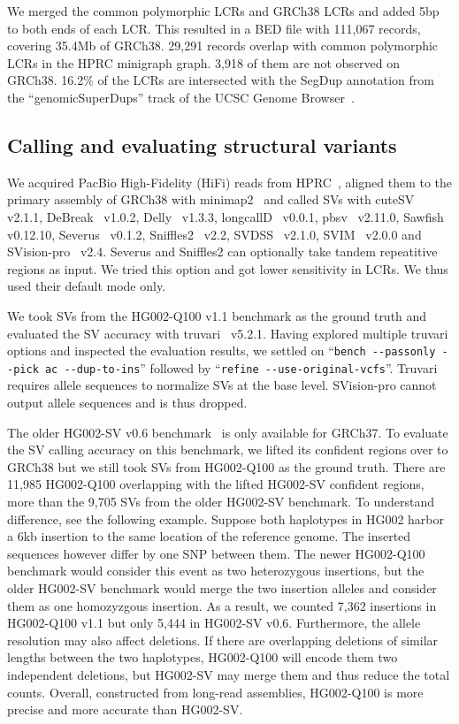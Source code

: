 \documentclass[a4paper,num-refs]{oup-contemporary}
\begin{document}
We merged the common polymorphic LCRs and GRCh38 LCRs and added 5bp to both ends of each LCR.
This resulted in a BED file with 111,067 records, covering 35.4Mb of GRCh38.
29,291 records overlap with common polymorphic LCRs in the HPRC minigraph graph.
3,918 of them are not observed on GRCh38.
16.2\% of the LCRs are intersected with the SegDup annotation from the ``genomicSuperDups'' track of the UCSC Genome Browser~\cite{Perez:2025aa}.

\subsection{Calling and evaluating structural variants}

We acquired PacBio High-Fidelity (HiFi) reads from HPRC~\cite{hifi-read},
aligned them to the primary assembly of GRCh38 with minimap2~\cite{Li:2018ab}
and called SVs with
cuteSV~\cite{Jiang:2020aa} v2.1.1,
DeBreak~\cite{Chen:2023aa} v1.0.2,
Delly~\cite{Rausch:2012aa} v1.3.3,
longcallD~\cite{longcalld} v0.0.1,
pbsv~\cite{pbsv} v2.11.0,
Sawfish~\cite{Saunders:2025aa} v0.12.10,
Severus~\cite{Keskus:2025aa} v0.1.2,
Sniffles2~\cite{Smolka:2024ab} v2.2,
SVDSS~\cite{Denti:2023aa} v2.1.0,
SVIM~\cite{Heller:2019aa} v2.0.0
and SVision-pro~\cite{Wang:2025aa} v2.4.
Severus and Sniffles2 can optionally take tandem repeatitive regions as input.
We tried this option and got lower sensitivity in LCRs.
We thus used their default mode only.

We took SVs from the HG002-Q100 v1.1 benchmark as the ground truth
and evaluated the SV accuracy with truvari~\cite{English:2022aa} v5.2.1.
Having explored multiple truvari options and inspected the evaluation results,
we settled on ``{\tt bench -{}-passonly -{}-pick ac -{}-dup-to-ins}''
followed by ``{\tt refine -{}-use-original-vcfs}''.
Truvari requires allele sequences to normalize SVs at the base level.
SVision-pro cannot output allele sequences and is thus dropped.

The older HG002-SV v0.6 benchmark~\cite{Zook:2020aa} is only available for GRCh37.
To evaluate the SV calling accuracy on this benchmark,
we lifted its confident regions over to GRCh38
but we still took SVs from HG002-Q100 as the ground truth.
There are 11,985 HG002-Q100 overlapping with the lifted HG002-SV confident regions,
more than the 9,705 SVs from the older HG002-SV benchmark.
To understand difference, see the following example.
Suppose both haplotypes in HG002 harbor a 6kb insertion to the same location of the reference genome.
The inserted sequences however differ by one SNP between them.
The newer HG002-Q100 benchmark
would consider this event as two heterozygous insertions,
but the older HG002-SV benchmark would merge the two insertion alleles and consider them as one homozyzgous insertion.
As a result, we counted 7,362 insertions in HG002-Q100 v1.1 but only 5,444 in HG002-SV v0.6.
Furthermore, the allele resolution may also affect deletions.
If there are overlapping deletions of similar lengths between the two haplotypes,
HG002-Q100 will encode them two independent deletions,
but HG002-SV may merge them and thus reduce the total counts.
Overall, constructed from long-read assemblies, HG002-Q100 is more precise and more accurate than HG002-SV.
\end{document}
